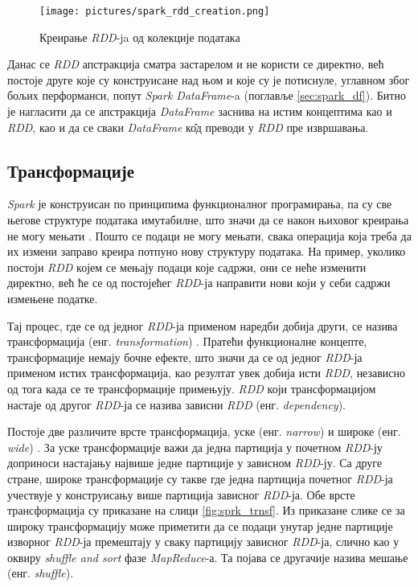 \documentclass[12pt,oneside]{memoir}
\begin{document}
\begin{figure}[!ht]
  \centering
  \texttt{[image: pictures/spark\_rdd\_creation.png]}
  \caption{Креирање \textit{RDD}-ja од колекције података}
  \label{fig:spark_rdd_creation_png}
\end{figure}

Данас се \textit{RDD} апстракција сматра застарелом и не користи се директно, већ постоје друге које су конструисане над њом и које су је потиснуле, углавном због бољих перформанси, попут \textit{Spark DataFrame}-a (поглавље \ref{sec:spark_df}). Битно је нагласити да се апстракција \textit{DataFrame} заснива на истим концептима као и \textit{RDD}, као и да се сваки \textit{DataFrame} к\^{о}д преводи у \textit{RDD} пре извршавања.

\subsection{Трансформације}
\label{subsec:spark_transf}

\textit{Spark} је конструисан по принципима функционалног програмирања, па су све његове структуре података имутабилне, што значи да се након њиховог креирања не могу мењати \cite{spark_guide}. Пошто се подаци не могу мењати, свака операција која треба да их измени заправо креира потпуно нову структуру података. На пример, уколико постоји \textit{RDD} којем се мењају подаци које садржи, они се неће изменити директно, већ ће се од постојећег \textit{RDD}-ја направити нови који у себи садржи измењене податке.

Тај процес, где се од једног \textit{RDD}-ја применом наредби добија други, се назива трансформација (енг. \textit{transformation})  \cite{spark_guide}. Пратећи функционалне концепте, трансформације немају бочне ефекте, што значи да се од једног \textit{RDD}-ја применом истих трансформација, као резултат увек добија исти \textit{RDD}, независно од тога када се те трансформације примењују. \textit{RDD} који трансформацијом настаје од другог \textit{RDD}-ја се назива зависни \textit{RDD} (енг. \textit{dependency}).

Постоје две различите врсте трансформација, уске (енг. \textit{narrow}) и широке (енг. \textit{wide}) \cite{spark_guide}. За уске трансформације важи да једна партиција у почетном \textit{RDD}-ју доприноси настајању највише једне партиције у зависном \textit{RDD}-ју. Са друге стране, широке трансформације су такве где једна партиција почетног \textit{RDD}-ја учествује у конструисању више партиција зависног \textit{RDD}-ја. Обе врсте трансформација су приказане на слици \ref{fig:sprk_trnsf}. Из приказане слике се за широку трансформацију може приметити да се подаци унутар једне партиције изворног \textit{RDD}-ја премештају у сваку партицију зависног \textit{RDD}-ја, слично као у оквиру \textit{shuffle and sort} фазе \textit{MapReduce}-а. Та појава се другачије назива мешање (енг. \textit{shuffle}).
\end{document}
